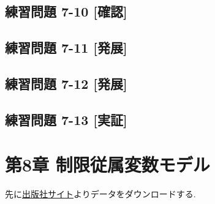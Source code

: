 \documentclass[
]{book}
\begin{document}
\hypertarget{ux7df4ux7fd2ux554fux984c-7-10-ux78baux8a8d}{%
\section*{練習問題 7-10 {[}確認{]}}\label{ux7df4ux7fd2ux554fux984c-7-10-ux78baux8a8d}}

\hypertarget{ux7df4ux7fd2ux554fux984c-7-11-ux767aux5c55}{%
\section*{練習問題 7-11 {[}発展{]}}\label{ux7df4ux7fd2ux554fux984c-7-11-ux767aux5c55}}

\hypertarget{ux7df4ux7fd2ux554fux984c-7-12-ux767aux5c55}{%
\section*{練習問題 7-12 {[}発展{]}}\label{ux7df4ux7fd2ux554fux984c-7-12-ux767aux5c55}}

\hypertarget{ux7df4ux7fd2ux554fux984c-7-13-ux5b9fux8a3c}{%
\section*{練習問題 7-13 {[}実証{]}}\label{ux7df4ux7fd2ux554fux984c-7-13-ux5b9fux8a3c}}

\hypertarget{ch8}{%
\chapter*{第8章 制限従属変数モデル}\label{ch8}}

先に\href{https://www.yuhikaku.co.jp/books/detail/9784641053854}{出版社サイト}よりデータをダウンロードする.
\end{document}

